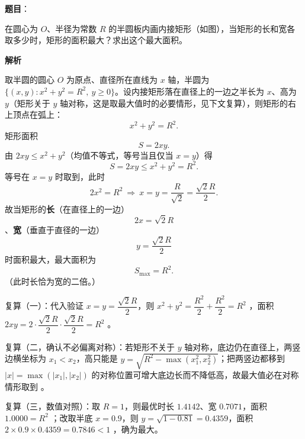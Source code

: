 \begin{answer}

\textbf{题目}：

在圆心为 $O$、半径为常数 $R$ 的半圆板内画内接矩形（如图），当矩形的长和宽各取多少时，矩形的面积最大？求出这个最大面积。
\nopagebreak[4]
\begin{center}\end{center}
\nopagebreak[4]
\textbf{解析}
\nopagebreak[4]
\begin{center}\end{center}
\nopagebreak[4]
取半圆的圆心 $O$ 为原点、直径所在直线为 $x$ 轴，半圆为 $\{(x,y):x^2+y^2=R^2,\ y\ge0\}$。设内接矩形落在直径上的一边之半长为 $x$、高为 $y$（矩形关于 $y$ 轴对称，这是取最大值时的必要情形，见下文复算），则矩形的右上顶点在弧上：
\nopagebreak[4]
\[
x^2+y^2=R^2.
\]
矩形面积
\nopagebreak[4]
\[
S=2xy.
\]
由 $2xy\le x^2+y^2$（均值不等式，等号当且仅当 $x=y$）得
\nopagebreak[4]
\[
S=2xy\le x^2+y^2=R^2.
\]
等号在 $x=y$ 时取到，此时
\nopagebreak[4]
\[
2x^2=R^2\ \Longrightarrow\ x=y=\frac{R}{\sqrt2}=\frac{\sqrt2R}{2}.
\]
故当矩形的\textbf{长}（在直径上的一边）
\nopagebreak[4]
\[
2x=\sqrt2R
\]
、\textbf{宽}（垂直于直径的一边）
\nopagebreak[4]
\[
y=\frac{\sqrt2R}{2}
\]
时面积最大，最大面积为
\nopagebreak[4]
\[
S_{\max}=R^2.
\]
（此时长恰为宽的二倍。）

复算（一）：代入验证 $x=y=\dfrac{\sqrt2R}{2}$，则 $x^2+y^2=\dfrac{R^2}{2}+\dfrac{R^2}{2}=R^2$ ，面积 $2xy=2\cdot\dfrac{\sqrt2R}{2}\cdot\dfrac{\sqrt2R}{2}=R^2$ 。

复算（二，确认不必偏离对称）：若矩形不关于 $y$ 轴对称，底边仍在直径上，两竖边横坐标为 $x_1<x_2$，高只能是 $y=\sqrt{R^2-\max(x_1^2,x_2^2)}$；把两竖边都移到 $|x|=\max(|x_1|,|x_2|)$ 的对称位置可增大底边长而不降低高，故最大值必在对称情形取到 。

复算（三，数值对照）：取 $R=1$，则最优时长 $1.4142$、宽 $0.7071$，面积 $1.0000=R^2$ ；改取半底 $x=0.9$，则 $y=\sqrt{1-0.81}=0.4359$，面积 $2\times0.9\times0.4359=0.7846<1$ ，确为最大。


\end{answer}
